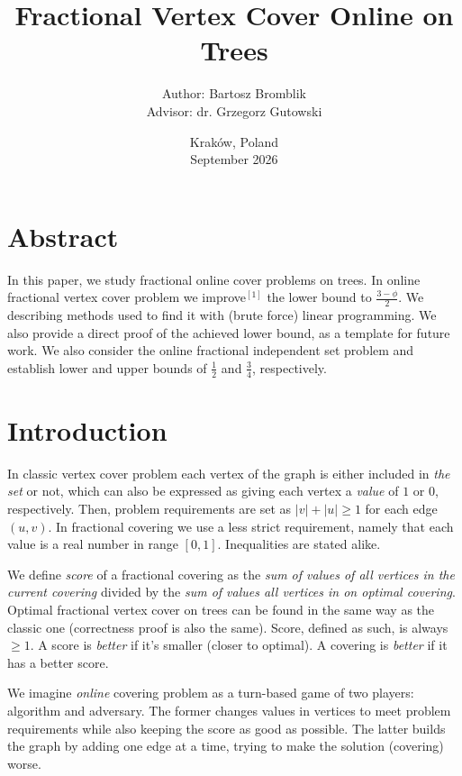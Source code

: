 \documentclass[12pt, A4]{article}
\title{Fractional Vertex Cover Online on Trees}
\author{
    Author: Bartosz Bromblik \\
    Advisor: dr. Grzegorz Gutowski
}
\date{Kraków, Poland \\ September 2026}
\begin{document}
\maketitle



\section*{Abstract}
In this paper, we study fractional online cover problems on trees. In online fractional vertex cover problem we improve$^{[1]}$ the lower bound to $\frac{3 - \phi}{2}$. We describing methods used to find it with (brute force) linear programming. We also provide a direct proof of the achieved lower bound, as a template for future work.
\newline
We also consider the online fractional independent set problem and establish lower and upper bounds of $\frac{1}{2}$ and $\frac{3}{4}$, respectively.
\bigskip
\bigskip
\bigskip


\tableofcontents



\newpage
\section{Introduction}
In classic vertex cover problem each vertex of the graph is either included in \textit{the set} or not, which can also be expressed as giving each vertex a \textit{value} of $1$ or $0$, respectively. Then, problem requirements are set as $|v| + |u| \ge 1$ for each edge $(u, v)$. In fractional covering we use a less strict requirement, namely that each value is a real number in range $[0, 1]$. Inequalities are stated alike.

We define \textit{score} of a fractional covering as the \textit{sum of values of all vertices in the current covering} divided by the \textit{sum of values all vertices in on optimal covering}. Optimal fractional vertex cover on trees can be found in the same way as the classic one (correctness proof is also the same). Score, defined as such, is always $\ge 1$. A score is \textit{better} if it's smaller (closer to optimal). A covering is \textit{better} if it has a better score.

We imagine \textit{online} covering problem as a turn-based game of two players: algorithm and adversary. The former changes values in vertices to meet problem requirements while also keeping the score as good as possible. The latter builds the graph by adding one edge at a time, trying to make the solution (covering) worse.
\end{document}
